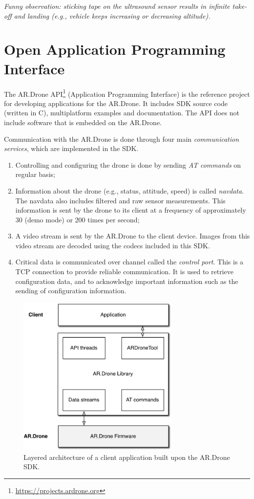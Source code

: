 \textit{Funny observation: sticking tape on the ultrasound sensor results in infinite take-off and landing (e.g., vehicle keeps increasing or decreasing altitude).}


\section{Open Application Programming Interface}
\label{sec:API}
The AR.Drone API\footnote{\url{https://projects.ardrone.org}} (Application Programming Interface) is the reference project for developing applications for the AR.Drone.
It includes SDK source code (written in C), multiplatform examples and documentation.
The API does not include software that is embedded on the AR.Drone.

Communication with the AR.Drone is done through four main \textit{communication services}, which are implemented in the SDK.
\begin{enumerate}
\item Controlling and configuring the drone is done by sending \textit{AT commands} on regular basis;
\item Information about the drone (e.g., status, attitude, speed) is called \textit{navdata}.
The navdata also includes filtered and raw sensor measurements.
This information is sent by the drone to its client at a frequency of approximately 30 (demo mode) or 200 times per second;
\item A video stream is sent by the AR.Drone to the client device.
Images from this video stream are decoded using the codecs included in this SDK.
\item Critical data is communicated over channel called the \textit{control port}.
This is a TCP connection to provide reliable communication.
It is used to retrieve configuration data, and to acknowledge important information such as the sending of configuration information.
\end{enumerate}

\begin{figure}[htb]
\centering
\includegraphics[height=8cm]{images/platform_ardroneapi.pdf}
\caption{Layered architecture of a client application built upon the AR.Drone SDK.}
\label{fig:platform-ardroneapi}
\end{figure}

